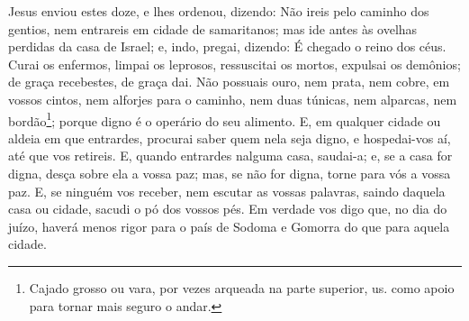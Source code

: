 Jesus enviou estes doze, e lhes ordenou, dizendo: Não ireis pelo
caminho dos gentios, nem entrareis em cidade de samaritanos; mas
ide antes às ovelhas perdidas da casa de Israel; e, indo,
pregai, dizendo: É chegado o reino dos céus. Curai os enfermos,
limpai os leprosos, ressuscitai os mortos, expulsai os demônios; de
graça recebestes, de graça dai. Não possuais ouro, nem prata,
nem cobre, em vossos cintos, nem alforjes para o caminho, nem
duas túnicas, nem alparcas, nem bordão\footnote{Cajado grosso ou
vara, por vezes arqueada na parte superior, us. como apoio para
tornar mais seguro o andar.}; porque digno é o operário do seu
alimento. E, em qualquer cidade ou aldeia em que entrardes,
procurai saber quem nela seja digno, e hospedai-vos aí, até que vos
retireis. E, quando entrardes nalguma casa, saudai-a;
e, se a casa for digna, desça sobre ela a vossa paz; mas, se
não for digna, torne para vós a vossa paz. E, se ninguém vos
receber, nem escutar as vossas palavras, saindo daquela casa ou
cidade, sacudi o pó dos vossos pés. Em verdade vos digo que,
no dia do juízo, haverá menos rigor para o país de Sodoma e Gomorra
do que para aquela cidade.

